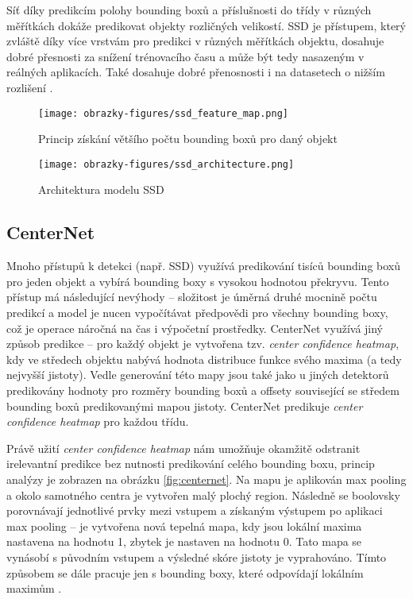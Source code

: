 Síť díky predikcím polohy bounding boxů a příslušnosti do třídy v různých měřítkách dokáže predikovat objekty rozličných velikostí. SSD je přístupem, který zvláště díky více vrstvám pro predikci v různých měřítkách objektu, dosahuje dobré přesnosti za snížení trénovacího času a může být tedy nasazeným v reálných aplikacích. Také dosahuje dobré přenosnosti i na datasetech o nižším rozlišení \cite{SSD, SSDFasterR-CNNComparison}.

\begin{figure}[!htbp]
    \centering
    \texttt{[image: obrazky-figures/ssd\_feature\_map.png]}
    \caption{Princip získání většího počtu bounding boxů pro daný objekt \cite{SSD}}
\end{figure} 

\begin{figure}[!htbp]
    \centering
    \texttt{[image: obrazky-figures/ssd\_architecture.png]}
    \caption{Architektura modelu SSD \cite{SSD}}
\end{figure} 

\subsection*{CenterNet}
Mnoho přístupů k detekci (např. SSD) využívá predikování tisíců bounding boxů pro jeden objekt a vybírá bounding boxy s vysokou hodnotou překryvu. Tento přístup má následující nevýhody -- složitost je úměrná druhé mocnině počtu predikcí a model je nucen vypočítávat předpovědi pro všechny bounding boxy, což je operace náročná na čas i výpočetní prostředky. CenterNet využívá jiný způsob predikce -- pro každý objekt je vytvořena tzv. \textit{center confidence heatmap}, kdy ve středech objektu nabývá hodnota distribuce funkce svého maxima (a tedy nejvyšší jistoty). Vedle generování této mapy jsou také jako u jiných detektorů predikovány hodnoty pro rozměry bounding boxů a offsety související se středem bounding boxů predikovanými mapou jistoty. CenterNet predikuje \textit{center confidence heatmap} pro každou třídu.

Právě užití \textit{center confidence heatmap} nám umožňuje okamžitě odstranit irelevantní predikce bez nutnosti predikování celého bounding boxu, princip analýzy je zobrazen na obrázku \ref{fig:centernet}. Na mapu je aplikován max pooling a okolo samotného centra je vytvořen malý plochý region. Následně se boolovsky porovnávají jednotlivé prvky mezi vstupem a získaným výstupem po aplikaci max pooling -- je vytvořena nová tepelná mapa, kdy jsou lokální maxima nastavena na hodnotu 1, zbytek je nastaven na hodnotu 0. Tato mapa se vynásobí s původním vstupem a výsledné skóre jistoty je vyprahováno. Tímto způsobem se dále pracuje jen s bounding boxy, které odpovídají lokálním maximům \cite{CenterNet}.

